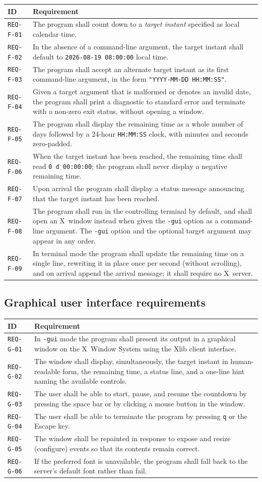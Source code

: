 \documentclass[12pt]{article}
\newcommand{\code}[1]{\texttt{#1}}
\newcommand{\req}[1]{\texttt{#1}}
\newcommand{\rrow}[2]{\req{#1} & #2 \\}
\begin{document}
\begin{longtable}{p{}p{}}
\toprule
\textbf{ID} & \textbf{Requirement} \\
\midrule
\endhead
\rrow{REQ-F-01}{The program shall count down to a \emph{target instant}
  specified as local calendar time.}
\rrow{REQ-F-02}{In the absence of a command-line argument, the target
  instant shall default to \code{2026-08-19 08:00:00} local time.}
\rrow{REQ-F-03}{The program shall accept an alternate target instant as
  its first command-line argument, in the form
  \code{"YYYY-MM-DD HH:MM:SS"}.}
\rrow{REQ-F-04}{Given a target argument that is malformed or denotes an
  invalid date, the program shall print a diagnostic to standard error
  and terminate with a non-zero exit status, without opening a window.}
\rrow{REQ-F-05}{The program shall display the remaining time as a whole
  number of days followed by a 24-hour \code{HH:MM:SS} clock, with minutes
  and seconds zero-padded.}
\rrow{REQ-F-06}{When the target instant has been reached, the remaining
  time shall read \code{0 d 00:00:00}; the program shall never display a
  negative remaining time.}
\rrow{REQ-F-07}{Upon arrival the program shall display a status message
  announcing that the target instant has been reached.}
\rrow{REQ-F-08}{The program shall run in the controlling terminal by
  default, and shall open an X~window instead when given the \code{-gui}
  option as a command-line argument.  The \code{-gui} option and the
  optional target argument may appear in any order.}
\rrow{REQ-F-09}{In terminal mode the program shall update the remaining
  time on a single line, rewriting it in place once per second (without
  scrolling), and on arrival append the arrival message; it shall require
  no X~server.}
\bottomrule
\end{longtable}

\subsection{Graphical user interface requirements}

\begin{longtable}{p{}p{}}
\toprule
\textbf{ID} & \textbf{Requirement} \\
\midrule
\endhead
\rrow{REQ-G-01}{In \code{-gui} mode the program shall present its output in
  a graphical window on the X~Window System using the Xlib client
  interface.}
\rrow{REQ-G-02}{The window shall display, simultaneously, the target
  instant in human-readable form, the remaining time, a status line, and a
  one-line hint naming the available controls.}
\rrow{REQ-G-03}{The user shall be able to start, pause, and resume the
  countdown by pressing the space bar or by clicking a mouse button in the
  window.}
\rrow{REQ-G-04}{The user shall be able to terminate the program by pressing
  \code{q} or the Escape key.}
\rrow{REQ-G-05}{The window shall be repainted in response to expose and
  resize (configure) events so that its contents remain correct.}
\rrow{REQ-G-06}{If the preferred font is unavailable, the program shall
  fall back to the server's default font rather than fail.}
\bottomrule
\end{longtable}
\end{document}
